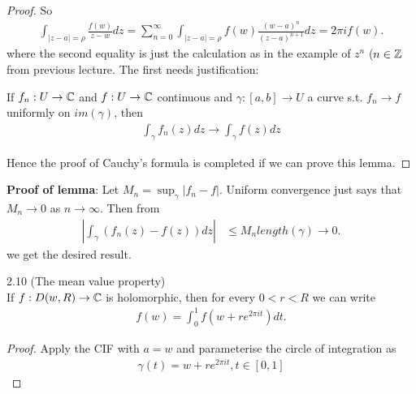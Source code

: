\documentclass[a4paper]{article}
\begin{document}
\begin{thm}
\begin{proof}
So
\begin{equation*}
\begin{aligned}
\int_{|z-a|=\rho} \frac{f(w)}{z-w} dz = \sum_{n=0}^\infty \int_{|z-a|=\rho} f(w) \frac{(w-a)^n}{(z-a)^{n+1}}dz = 2\pi i f(w).
\end{aligned}
\end{equation*}
where the second equality is just the calculation as in the example of $z^n$ ($n \in \mathbb{Z}$ from previous lecture. The first needs justification:
\begin{lemma}
If $f_n: U \to \mathbb{C}$ and $f:U \to \mathbb{C}$ continuous and $\gamma:[a,b] \to U$ a curve s.t. $f_n \to f$ uniformly on $im(\gamma)$, then
\begin{equation*}
\begin{aligned}
\int_\gamma f_n(z) dz \to \int_\gamma f(z) dz
\end{aligned}
\end{equation*}
\end{lemma}
Hence the proof of Cauchy's formula is completed if we can prove this lemma.
\end{proof}
\end{thm}

\textbf{Proof of lemma}: Let $M_n = \sup_\gamma |f_n-f|$. Uniform convergence just says that $M_n \to 0$ as $n \to \infty$. Then from
\begin{equation*}
\begin{aligned}
\left|\int_\gamma (f_n(z) - f(z)) dz \right| & \leq M_n length(\gamma) \to 0.
\end{aligned}
\end{equation*}
we get the desired result.

\begin{coro} 2.10 (The mean value property)\\
If $f:D(w,R) \to \mathbb{C}$ is holomorphic, then for every $0<r<R$ we can write
\begin{equation*}
\begin{aligned}
f(w) = \int_0^1 f(w+re^{2\pi it}) dt.
\end{aligned}
\end{equation*}
\begin{proof}
Apply the CIF with $a=w$ and parameterise the circle of integration as
\begin{equation*}
\begin{aligned}
\gamma(t) =w + re^{2\pi it}, t \in [0,1]
\end{aligned}
\end{equation*}
\end{proof}
\end{coro}
\end{document}
